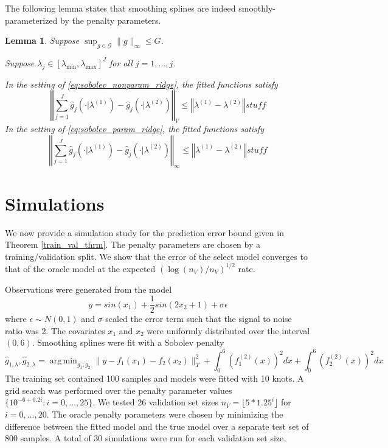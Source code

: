 \documentclass[12pt]{article}
\newtheorem{lemma}{Lemma}
\DeclareMathOperator*{\argmin}{arg\,min}
\begin{document}
The following lemma states that smoothing splines are indeed smoothly-parameterized by the penalty parameters.
\begin{lemma}
\label{lemma:sobolev}
Suppose $\sup_{g \in \mathcal{G}} \|g\|_\infty \le G$.

Suppose $\lambda_j \in [\lambda_{\min}, \lambda_{\max}]^J$ for all $j=1,...,j$.

In the setting of \eqref{eq:sobolev_nonparam_ridge}, the fitted functions satisfy
\begin{equation}
\left\Vert \sum_{j=1}^J \hat{g}_j(\cdot|\lambda^{(1)}) - \hat{g}_j(\cdot|\lambda^{(2)}) \right\Vert _V
\le
\left\Vert \lambda^{(1)}-\lambda^{(2)}\right\Vert
stuff
\end{equation}
In the setting of \eqref{eq:sobolev_param_ridge}, the fitted functions satisfy
\begin{equation}
\left\Vert \sum_{j=1}^J \hat{g}_j(\cdot|\lambda^{(1)}) - \hat{g}_j(\cdot|\lambda^{(2)}) \right\Vert _\infty
\le
\left\Vert \lambda^{(1)}-\lambda^{(2)}\right\Vert
stuff
\end{equation}
\end{lemma}

\section{Simulations}\label{sec:simulations}

We now provide a simulation study for the prediction error bound given in Theorem \ref{train_val_thrm}. The penalty parameters are chosen by a training/validation split. We show that the error of the select model converges to that of the oracle model at the expected $(\log(n_V)/n_V)^{1/2}$ rate.

Observations were generated from the model
\begin{equation}
y = sin(x_1) + \frac{1}{2} sin(2 x_2 + 1) + \sigma \epsilon
\end{equation}
where $\epsilon \sim N(0,1)$ and $\sigma$ scaled the error term such that the signal to noise ratio was 2.
The covariates $x_1$ and $x_2$ were uniformly distributed over the interval $(0,6)$.
Smoothing splines were fit with a Sobolev penalty
\begin{equation}
\hat{g}_{1, \lambda}, \hat{g}_{2, \lambda} = \argmin_{g_1, g_2} \| y - f_1(x_1) - f_2(x_2) \|_T^2 + \int_0^6 (f_1^{(2)}(x))^2 dx + \int_0^6 (f_2^{(2)}(x))^2 dx
\end{equation}
The training set contained 100 samples and models were fitted with 10 knots. A grid search was performed over the penalty parameter values $\{10^{-6 + 0.2i}: i = 0, ..., 25 \}$. We tested 26 validation set sizes $n_V = \lfloor 5 * 1.25^{i} \rfloor $ for $i = 0, ..., 20$. The oracle penalty parameters were chosen by minimizing the difference between the fitted model and the true model over a separate test set of 800 samples. A total of 30 simulations were run for each validation set size.
\end{document}
